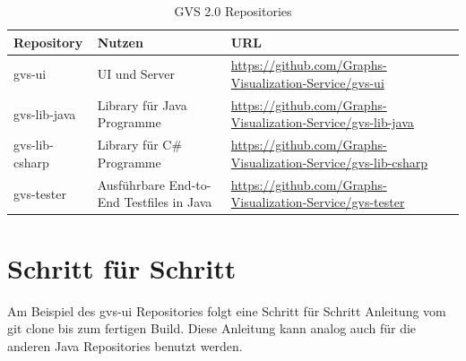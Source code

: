 \documentclass[11pt,a4paper,english,oneside]{book}
\numberwithin{equation}{chapter}
\begin{document}
	\begin{table}[h!]
		\centering
		\begin{tabularx}{\linewidth}{l l X}
			\toprule 
			Repository & Nutzen & URL \\
			\midrule
			gvs-ui & UI und Server & \url{https://github.com/Graphs-Visualization-Service/gvs-ui}  \\
			gvs-lib-java & Library für Java Programme & \url{https://github.com/Graphs-Visualization-Service/gvs-lib-java} \\
			gvs-lib-csharp & Library für C\# Programme & \url{https://github.com/Graphs-Visualization-Service/gvs-lib-csharp} \\
			gvs-tester & Ausführbare End-to-End Testfiles in Java & \url{https://github.com/Graphs-Visualization-Service/gvs-tester} \\
			\bottomrule 
		\end{tabularx} 
		\caption{GVS 2.0 Repositories} 
		\label{tbl:repos}
	\end{table}

\clearpage
	
	\section{Schritt für Schritt}
	Am Beispiel des gvs-ui Repositories folgt eine Schritt für Schritt Anleitung vom git clone bis zum fertigen Build. Diese Anleitung kann analog auch für die anderen Java Repositories benutzt werden.
	
\end{document}
